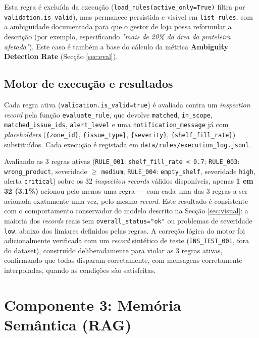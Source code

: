 \documentclass[conference]{IEEEtran}
\begin{document}
Esta regra é excluída da execução (\texttt{load\_rules(active\_only=True)}
filtra por \texttt{validation.is\_valid}), mas permanece persistida e
visível em \texttt{list rules}, com a ambiguidade documentada para que o
gestor de loja possa reformular a descrição (por exemplo, especificando
\textit{"mais de 20\% da área da prateleira afetada"}). Este caso é também a
base do cálculo da métrica \textbf{Ambiguity Detection Rate} (Secção
\ref{sec:eval}).

\subsection{Motor de execução e resultados}

Cada regra ativa (\texttt{validation.is\_valid=true}) é avaliada contra um
\textit{inspection record} pela função \texttt{evaluate\_rule}, que devolve
\texttt{matched}, \texttt{in\_scope}, \texttt{matched\_issue\_ids},
\texttt{alert\_level} e uma \texttt{notification\_message} já com
\textit{placeholders} (\texttt{\{zone\_id\}}, \texttt{\{issue\_type\}},
\texttt{\{severity\}}, \texttt{\{shelf\_fill\_rate\}}) substituídos. Cada
execução é registada em \texttt{data/rules/execution\_log.jsonl}.

Avaliando as 3 regras ativas
(\texttt{RULE\_001}: \texttt{shelf\_fill\_rate < 0.7};
\texttt{RULE\_003}: \texttt{wrong\_product}, severidade $\geq$
\texttt{medium}; \texttt{RULE\_004}: \texttt{empty\_shelf}, severidade
\texttt{high}, alerta \texttt{critical}) sobre os 32 \textit{inspection
records} válidos disponíveis, apenas \textbf{1 em 32 (3.1\%)} acionou pelo
menos uma regra --- com cada uma das 3 regras a ser acionada exatamente uma
vez, pelo mesmo \textit{record}. Este resultado é consistente com o
comportamento conservador do modelo descrito na Secção \ref{sec:visual}: a
maioria dos \textit{records} reais tem \texttt{overall\_status="ok"} ou
problemas de severidade \texttt{low}, abaixo dos limiares definidos pelas
regras. A correção lógica do motor foi adicionalmente verificada com um
\textit{record} sintético de teste (\texttt{INS\_TEST\_001}, fora do
dataset), construído deliberadamente para violar as 3 regras ativas,
confirmando que todas disparam corretamente, com mensagens corretamente
interpoladas, quando as condições são satisfeitas.

\section{Componente 3: Memória Semântica (RAG)}
\label{sec:rag}
\end{document}
